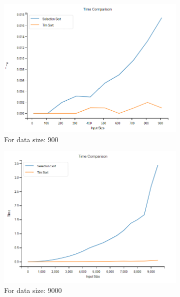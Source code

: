 \documentclass[twocolumn]{article}
\begin{document}
\begin{multicols}{2}
    \begin{figure}[h]
        \centering
        \begin{subfigure}{0.4\textwidth}
            \includegraphics[width=\linewidth]{Images/900_time_comp.png}
            \caption{For data size: 900}
            \label{d900}
        \end{subfigure}
        \hfill
        \begin{subfigure}{0.4\textwidth}
            \includegraphics[width=\linewidth]{Images/9k_time_comp.png}
            \caption{For data size: 9000}
            \label{d9k}
        \end{subfigure}
        \hfill
        \begin{subfigure}{0.4\textwidth}

\end{subfigure}
\end{figure}
\end{multicols}
\end{document}
